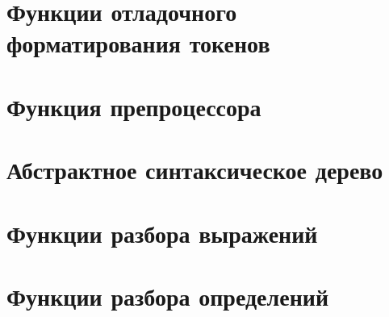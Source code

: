 \section*{Функции отладочного форматирования токенов}



\section*{Функция препроцессора}



\section*{Абстрактное синтаксическое дерево}


\section*{Функции разбора выражений}


\section*{Функции разбора определений}


% 

% 



